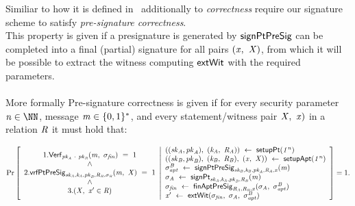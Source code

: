 \begin{definition}\label{def:preSigCorrectness}
    Similiar to how it is defined in~\cite{aumayr2020bitcoinchannels} additionally to \textit{correctness} require our signature scheme to satisfy \textit{pre-signature correctness}. \\
    This property is given if a presignature is generated by $\mathsf{signPtPreSig}$ can be completed into a final (partial) signature for all pairs $(\mathit{x} ,~ \mathit{X})$, from which it will
    be possible to extract the witness computing $\mathsf{extWit}$ with the required parameters.\\ \\
    More formally Pre-signature correctness is given if for every security parameter $\varN \in \cnstNatural$, message $\mathit{m} \in \{0,1\}^{*}$, and every statement/witness pair
    $\mathit{X} ,~ \mathit{x})$ in a relation $\mathit{R}$ it must hold that:
\begin{scriptsize}
    \[
        \Pr\left[
        \begin{array}{c}
            1. \mathsf{Verf}_{\mathit{pk}_{\mathit{A}} ~\cdot~ \mathit{pk}_{\mathit{B}}}(\mathit{m} ,~ \sigma_{\mathit{fin}}) ~=~ 1 \\
            ~\land~ \\
            2. \mathsf{vrfPtPreSig}_{\mathit{sk}_{\mathit{A}},\mathit{\mathit{k}_{\mathit{A}}},\mathit{pk}_{\mathit{B}},\mathit{R}_{\mathit{B}},\sigma_{\mathit{B}}}(\mathit{m} ,~ \mathit{X}) ~=~ 1 \\
            ~\land~ \\
            3. (\mathit{X} ,~ \mathit{x}' \in \mathit{R})
        \end{array}
        \middle\vert
        \begin{array}{l}
            ((\mathit{sk}_{\mathit{A}}, \mathit{pk}_{\mathit{A}}) ,~ (\mathit{\mathit{k}_{\mathit{A}}} ,~ \mathit{R}_{\mathit{A}})) ~\leftarrow~ \mathsf{setupPt} (\mathit{1^n}) \\
            ((\mathit{sk}_{\mathit{B}}, \mathit{pk}_{\mathit{B}}) ,~ (\mathit{\mathit{k}_{\mathit{B}}} ,~ \mathit{R}_{\mathit{B}}) ,~ (\mathit{x} ,~ \mathit{X})) ~\leftarrow~ \mathsf{setupApt}(\mathit{1^n}) \\
            \sigma^{\mathit{B}}_{\mathit{apt}} ~\leftarrow~ \mathsf{signPtPreSig}_{\mathit{sk}_{\mathit{B}},\mathit{\mathit{k}_{\mathit{B}}},\mathit{pk}_{\mathit{A}},\mathit{R}_{\mathit{A}},\mathit{x}}(\mathit{m}) \\
            \sigma_{\mathit{A}} ~\leftarrow~ \mathsf{signPt}_{\mathit{sk}_{\mathit{A}},\mathit{\mathit{k}_{\mathit{A}}},\mathit{pk}_{\mathit{B}},\mathit{R}_{\mathit{B}}}(\mathit{m}) \\
            \sigma_{\mathit{fin}} ~\leftarrow~ \mathsf{finAptPreSig}_{\mathit{R}_{\mathit{A}},\mathit{R}_{\mathit{B}},\mathit{x}}(\sigma_{\mathit{A}} ,~ \sigma^{\mathit{B}}_{\mathit{apt}}) \\
            \mathit{x}' ~\leftarrow~ \mathsf{extWit}(\sigma_{\mathit{fin}} ,~ \sigma_{\mathit{A}} ,~ \sigma^{\mathit{B}}_{\mathit{apt}})
        \end{array}
        \right]=1.
    \]
\end{scriptsize}
\end{definition}

